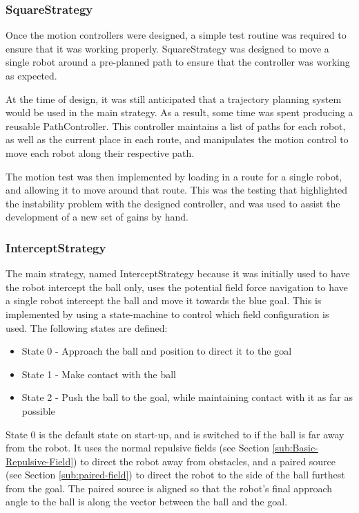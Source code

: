 \documentclass[10pt]{article}
\begin{document}
\subsubsection{SquareStrategy}

Once the motion controllers were designed, a simple test routine was required to
ensure that it was working properly.  SquareStrategy was designed to move a
single robot around a pre-planned path to ensure that the controller was working
as expected.

At the time of design, it was still anticipated that a trajectory planning
system would be used in the main strategy.  As a result, some time was spent
producing a reusable PathController.  This controller maintains a list of paths
for each robot, as well as the current place in each route, and manipulates the
motion control to move each robot along their respective path.

The motion test was then implemented by loading in a route for a single robot,
and allowing it to move around that route.  This was the testing that
highlighted the instability problem with the designed controller, and was used
to assist the development of a new set of gains by hand.

\subsubsection{InterceptStrategy}

The main strategy, named InterceptStrategy because it was initially used to have
the robot intercept the ball only, uses the potential field force navigation to
have a single robot intercept the ball and move it towards the blue goal.  This
is implemented by using a state-machine to control which field configuration is
used. The following states are defined:

\begin{itemize}
  \item State 0 - Approach the ball and position to direct it to the goal
  \item State 1 - Make contact with the ball
  \item State 2 - Push the ball to the goal, while maintaining contact with it
  as far as possible
\end{itemize}

State 0 is the default state on start-up, and is switched to if the ball is far
away from the robot.  It uses the normal repulsive fields (see Section
\ref{sub:Basic-Repulsive-Field}) to direct the robot away from obstacles, and a
paired source (see Section \ref{sub:paired-field}) to direct the robot to the
side of the ball furthest from the goal.  The paired source is aligned so that
the robot's final approach angle to the ball is along the vector between the
ball and the goal.
\end{document}
